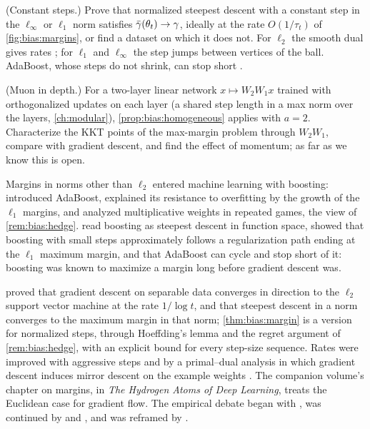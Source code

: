 \begin{refsection}
\begin{exercises}
\item \research (Constant steps.) Prove that normalized steepest descent with a constant step in the $\ell_\infty$ or $\ell_1$ norm satisfies $\bar\gamma(\theta_t)\to\gamma$, ideally at the rate $O(1/\tau_t)$ of \cref{fig:bias:margins}, or find a dataset on which it does not. For $\ell_2$ the smooth dual gives rates \parencite{JiTelgarsky2021}; for $\ell_1$ and $\ell_\infty$ the step jumps between vertices of the ball. AdaBoost, whose steps do not shrink, can stop short \parencite{RudinDaubechiesSchapire2004}.\label{ex:bias:constant}

\item \research (Muon in depth.) For a two-layer linear network $x\mapsto W_2W_1x$ trained with orthogonalized updates on each layer (a shared step length in a max norm over the layers, \cref{ch:modular}), \cref{prop:bias:homogeneous} applies with $a=2$. Characterize the KKT points of the max-margin problem through $W_2W_1$, compare with gradient descent, and find the effect of momentum; as far as we know this is open.\label{ex:bias:muon}
\end{exercises}

\notesandrefs
Margins in norms other than $\ell_2$ entered machine learning with boosting: \textcite{FreundSchapire1997} introduced AdaBoost, \textcite{SchapireEtAl1998} explained its resistance to overfitting by the growth of the $\ell_1$ margins, and \textcite{FreundSchapire1999} analyzed multiplicative weights in repeated games, the view of \cref{rem:bias:hedge}. \Textcite{Friedman2001} read boosting as steepest descent in function space, \textcite{RossetZhuHastie2004} showed that boosting with small steps approximately follows a regularization path ending at the $\ell_1$ maximum margin, and \textcite{RudinDaubechiesSchapire2004} that AdaBoost can cycle and stop short of it: boosting was known to maximize a margin long before gradient descent was.

\Textcite{SoudryEtAl2018} proved that gradient descent on separable data converges in direction to the $\ell_2$ support vector machine at the rate $1/\log t$, and \textcite{GunasekarEtAl2018} that steepest descent in a norm converges to the maximum margin in that norm; \cref{thm:bias:margin} is a version for normalized steps, through Hoeffding's lemma and the regret argument of \cref{rem:bias:hedge}, with an explicit bound for every step-size sequence. Rates were improved with aggressive steps \parencite{NacsonEtAl2019} and by a primal--dual analysis in which gradient descent induces mirror descent on the example weights \parencite{JiTelgarsky2021}. The companion volume's chapter on margins, in \emph{The Hydrogen Atoms of Deep Learning}, treats the Euclidean case for gradient flow. The empirical debate began with \textcite{WilsonEtAl2017}, was continued by \textcite{KeskarSocher2017} and \textcite{LoshchilovHutter2019}, and was reframed by \textcite{ChoiEtAl2019}.


\end{refsection}
